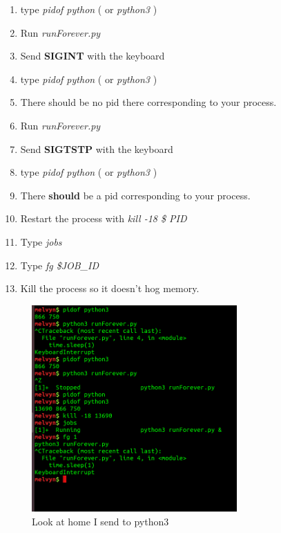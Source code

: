 \documentclass[12pt]{article}
\begin{document}
\begin{enumerate}
\item type \textit{pidof python} ( or \textit{python3} )
\item Run \textit{runForever.py}
\item Send \textbf{SIGINT} with the keyboard
\item type \textit{pidof python} ( or \textit{python3} )
\item There should be no pid there corresponding to your process.
\item Run \textit{runForever.py}
\item Send \textbf{SIGTSTP} with the keyboard
\item type \textit{pidof python} ( or \textit{python3} )
\item There \textbf{should} be a pid corresponding to your process.
\item Restart the process with \textit{kill -18 \$ PID}
\item Type \textit{jobs}
\item Type \textit{fg \$JOB\_ID}
\item Kill the process so it doesn't hog memory.
\end{enumerate}

\begin{figure}[ht]
	\centering
	\includegraphics[width=0.7\textwidth]{signals.png}
	\caption{Look at home I send to python3}
	\label{fig:pythonsignals}
\end{figure}
\end{document}
